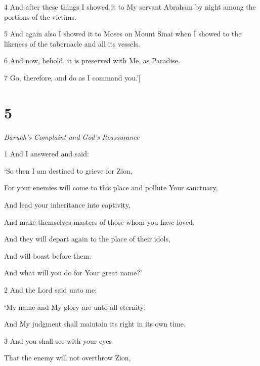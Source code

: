 \par 4 And after these things I showed it to My servant Abraham by night among the portions of the victims. 

\par 5 And again also I showed it to Moses on Mount Sinai when I showed to the likeness of the tabernacle and all its vessels. 

\par 6 And now, behold, it is preserved with Me, as Paradise. 

\par 7 Go, therefore, and do as I command you.’]

\chapter{5}

\par \textit{Baruch's Complaint and God's Reassurance}

\par 1 And I answered and said:

\par ‘So then I am destined to grieve for Zion,

\par For your enemies will come to this place and pollute Your sanctuary,

\par And lead your inheritance into captivity,

\par And make themselves masters of those whom you have loved,

\par And they will depart again to the place of their idols,

\par And will boast before them:

\par And what will you do for Your great name?’

\par 2 And the Lord said unto me:

\par ‘My name and My glory are unto all eternity;

\par And My judgment shall maintain its right in its own time.

\par 3 And you shall see with your eyes

\par That the enemy will not overthrow Zion,


